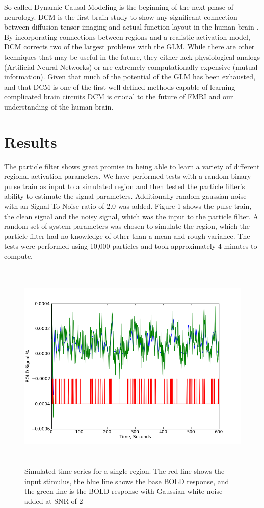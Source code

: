 \documentclass{article}
\begin{document}
So called Dynamic Causal Modeling is the beginning of 
the next phase of neurology. DCM is the first 
brain study to show any significant connection between 
diffusion tensor imaging and actual function layout in
the human brain \citep{dti_dcm}. By incorporating connections
between regions and a realistic activation model, DCM
corrects two of the largest problems with the GLM. While
there are other techniques that may be useful in the future,
they either lack physiological analogs (Artificial Neural
Networks) or are extremely computationally expensive 
(mutual information).  Given that much of the 
potential of the GLM has been exhausted, and that DCM 
is one of the first well defined methods capable of learning 
complicated brain circuits DCM is crucial to the future
of FMRI and our understanding of the human brain.

\section*{Results}
The particle filter shows great promise in being able 
to learn a variety of different regional activation
parameters. We have performed tests with a random binary
pulse train as input to a simulated region and then tested
the particle filter's ability to estimate the signal
parameters. Additionally random gaussian noise with an
Signal-To-Noise ratio of 2.0 was added. Figure 1 shows
the pulse train, the clean signal and the noisy signal, which
was the input to the particle filter. A random set of 
system parameters was chosen to simulate the region,
which the particle filter had no knowledge of other than
a mean and rough variance.
The tests were performed using 10,000 particles and took
approximately 4 minutes to compute.

\begin{figure}
\includegraphics[width=8in,height=4in]{noise.png}
\caption{Simulated time-series for a single region. The red line
shows the input stimulus, the blue line shows the base BOLD 
response, and the green line is the BOLD response with Gaussian
white noise added at SNR of 2}
\label{fig:noise}
\end{figure}
\end{document}
